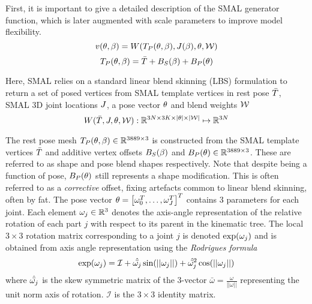 First, it is important to give a detailed description of the SMAL generator function, which is later augmented with scale parameters to improve model flexibility. 
\begin{equation}
    v(\theta,\beta) = W(T_{P}(\theta, \beta), J(\beta), \theta, \mathcal{W})
\end{equation}
\begin{equation}
    T_{P}(\theta,\beta) = \bar{T} + B_{S}(\beta) + B_{P}(\theta)
\end{equation}

Here, SMAL relies on a standard linear blend skinning (LBS) formulation to return a set of posed vertices from SMAL template vertices in rest pose $\bar{T}$, SMAL 3D joint locations $J$, a pose vector $\theta$ and blend weights $\mathcal{W}$
\begin{equation}
    W(\bar{T},J,\theta,\mathcal{W}) : \mathbb{R}^{3N \times 3K \times |\theta| \times |\mathcal{W}|} \mapsto {\mathbb{R}^{3N}}
\end{equation}

The rest pose mesh $T_{P}(\theta,\beta) \in {\mathbb{R}^{3889 \times 3}}$ is constructed from the SMAL template vertices $\bar{T}$ and additive vertex offsets $B_{S}(\beta)$ and $B_{P}(\theta) \in {\mathbb{R}^{3889 \times 3}}$. These are referred to as shape and pose blend shapes respectively. Note that despite being a function of pose, $B_{P}(\theta)$ still represents a shape modification. This is often referred to as a \emph{corrective} offset, fixing artefacts common to linear blend skinning, often by fat. The pose vector $\theta = \left[\omega_{0}^{T},\dots,\omega_{J}^{T}\right]^{T}$ contains 3 parameters for each joint. Each element $\omega_{j} \in {\mathbb{R}^{3}}$ denotes the axis-angle representation of the relative rotation of each part $j$ with respect to its parent in the kinematic tree. The local $3 \times 3$ rotation matrix corresponding to a joint $j$ is denoted $\exp(\omega_{j})$ and is obtained from axis angle representation using the \emph{Rodrigues formula}
\begin{equation}
    \exp(\omega_{j}) = \mathcal{I} + \hat{\bar{\omega_{j}}}\sin(||\omega_{j}||) + \hat{\bar{\omega_{j}}}^{2}\cos(||\omega_{j}||)
\end{equation}
where $\hat{\bar{\omega_{j}}}$ is the skew symmetric matrix of the 3-vector $\bar{\omega} = \frac{\omega}{||\omega||}$ representing the unit norm axis of rotation. $\mathcal{I}$ is the $3 \times 3$ identity matrix.

